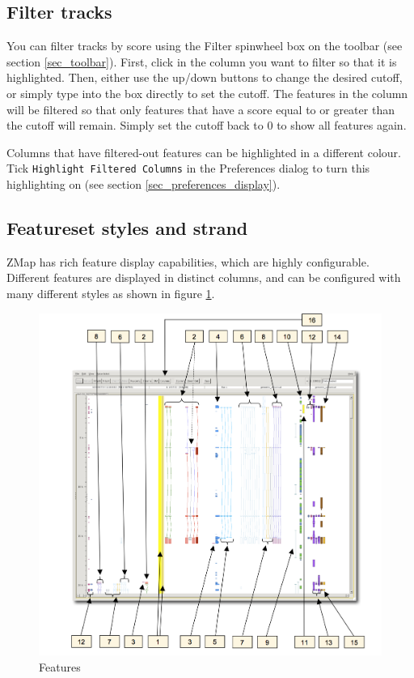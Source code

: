 \documentclass[letterpaper]{article}
\begin{document}
\subsection{Filter tracks} \label{sec_filter}
You can filter tracks by score using the Filter spinwheel box on the toolbar (see section \ref{sec_toolbar}). First, click in the column you want to filter so that it is highlighted. Then, either use the up/down buttons to change the desired cutoff, or simply type into the box directly to set the cutoff. The features in the column will be filtered so that only features that have a score equal to or greater than the cutoff will remain. Simply set the cutoff back to 0 to show all features again.

Columns that have filtered-out features can be highlighted in a different colour. Tick \lstinline{Highlight Filtered Columns} in the Preferences dialog to turn this highlighting on (see section \ref{sec_preferences_display}).


\subsection{Featureset styles and strand}
ZMap has rich feature display capabilities, which are highly configurable. Different features are displayed in distinct columns, and can be configured with many different styles as shown in figure \ref{img_features}. 

\begin{figure}
\centering
\color[rgb]{0.30980393,0.5058824,0.7411765}
\includegraphics[width=15.231cm]{img_features.png}
\caption{Features}
\label{img_features}
\end{figure}
\end{document}
